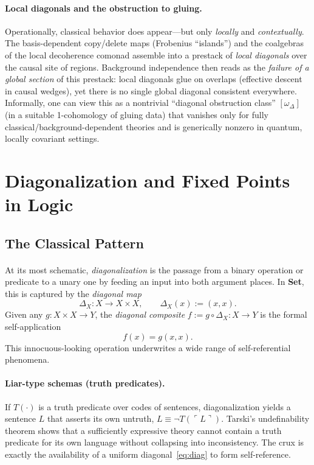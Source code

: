 \documentclass[11pt]{article}
\theoremstyle{upright}
\begin{document}
\paragraph{Local diagonals and the obstruction to gluing.}
Operationally, classical behavior does appear—but only \emph{locally} and \emph{contextually}. The basis-dependent copy/delete maps (Frobenius ``islands'') and the coalgebras of the local decoherence comonad assemble into a prestack of \emph{local diagonals} over the causal site of regions. Background independence then reads as the \emph{failure of a global section} of this prestack: local diagonals glue on overlaps (effective descent in causal wedges), yet there is no single global diagonal consistent everywhere. Informally, one can view this as a nontrivial ``diagonal obstruction class'' $[\omega_\Delta]$ (in a suitable 1-cohomology of gluing data) that vanishes only for fully classical/background-dependent theories and is generically nonzero in quantum, locally covariant settings.

\section{Diagonalization and Fixed Points in Logic}
\label{sec:diag-fixed}

\subsection{The Classical Pattern}

\paragraph{}
At its most schematic, \emph{diagonalization} is the passage from a binary operation or predicate to a unary one by feeding an input into both argument places. In \textbf{Set}, this is captured by the \emph{diagonal map}
\begin{equation}\label{eq:diag}
\Delta_X : X \to X \times X,
\qquad
\Delta_X(x) := (x,x).
\end{equation}
Given any $g : X \times X \to Y$, the \emph{diagonal composite} $f := g \circ \Delta_X : X \to Y$ is the formal self-application
\begin{equation}\label{eq:selfapp}
f(x) = g(x,x).
\end{equation}
This innocuous-looking operation underwrites a wide range of self-referential phenomena.

\paragraph{Liar-type schemas (truth predicates).}
If $T(\cdot)$ is a truth predicate over codes of sentences, diagonalization yields a sentence $L$ that asserts its own untruth, $L \equiv \neg T(\ulcorner L\urcorner)$. Tarski's undefinability theorem shows that a sufficiently expressive theory cannot contain a truth predicate for its own language without collapsing into inconsistency. The crux is exactly the availability of a uniform diagonal~\eqref{eq:diag} to form self-reference.
\end{document}
